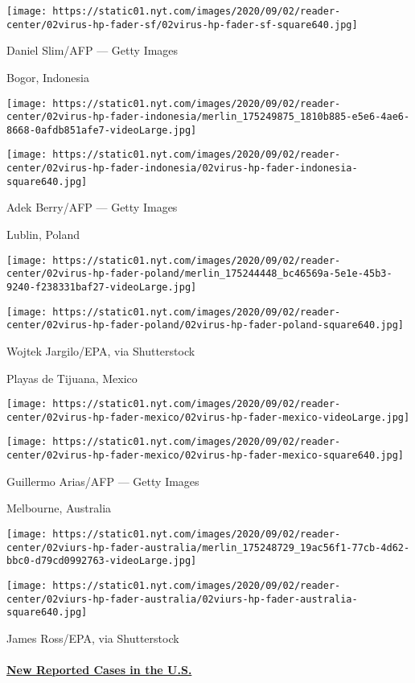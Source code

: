 \texttt{[image: https://static01.nyt.com/images/2020/09/02/reader-center/02virus-hp-fader-sf/02virus-hp-fader-sf-square640.jpg]}

 Daniel Slim/AFP --- Getty Images

Bogor, Indonesia

\texttt{[image: https://static01.nyt.com/images/2020/09/02/reader-center/02virus-hp-fader-indonesia/merlin\_175249875\_1810b885-e5e6-4ae6-8668-0afdb851afe7-videoLarge.jpg]}

\texttt{[image: https://static01.nyt.com/images/2020/09/02/reader-center/02virus-hp-fader-indonesia/02virus-hp-fader-indonesia-square640.jpg]}

 Adek Berry/AFP --- Getty Images

Lublin, Poland

\texttt{[image: https://static01.nyt.com/images/2020/09/02/reader-center/02virus-hp-fader-poland/merlin\_175244448\_bc46569a-5e1e-45b3-9240-f238331baf27-videoLarge.jpg]}

\texttt{[image: https://static01.nyt.com/images/2020/09/02/reader-center/02virus-hp-fader-poland/02virus-hp-fader-poland-square640.jpg]}

 Wojtek Jargilo/EPA, via Shutterstock

Playas de Tijuana, Mexico

\texttt{[image: https://static01.nyt.com/images/2020/09/02/reader-center/02virus-hp-fader-mexico/02virus-hp-fader-mexico-videoLarge.jpg]}

\texttt{[image: https://static01.nyt.com/images/2020/09/02/reader-center/02virus-hp-fader-mexico/02virus-hp-fader-mexico-square640.jpg]}

 Guillermo Arias/AFP --- Getty Images

Melbourne, Australia

\texttt{[image: https://static01.nyt.com/images/2020/09/02/reader-center/02viurs-hp-fader-australia/merlin\_175248729\_19ac56f1-77cb-4d62-bbc0-d79cd0992763-videoLarge.jpg]}

\texttt{[image: https://static01.nyt.com/images/2020/09/02/reader-center/02viurs-hp-fader-australia/02viurs-hp-fader-australia-square640.jpg]}

 James Ross/EPA, via Shutterstock

\hypertarget{new-reported-cases-in-the-us}{%
\paragraph{\texorpdfstring{\href{https://www.nytimes.com/interactive/2020/us/coronavirus-us-cases.html}{New
Reported Cases in the
U.S.}}{New Reported Cases in the U.S.}}\label{new-reported-cases-in-the-us}}

